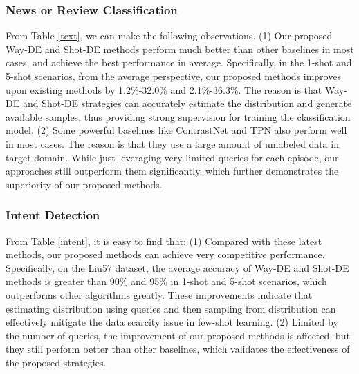 \documentclass[letterpaper]{article} %
\begin{document}
\subsubsection{News or Review Classification}
From Table \ref{text}, we can make the following observations. (1) Our proposed Way-DE and Shot-DE methods perform much better than other baselines in most cases, and achieve the best performance in average. Specifically, in the 1-shot and 5-shot scenarios, from the average perspective, our proposed methods improves upon existing methods by 1.2\%-32.0\% and 2.1\%-36.3\%. The reason is that Way-DE and Shot-DE strategies can accurately estimate the distribution and generate available samples, thus providing strong supervision for training the classification model.  (2) Some powerful baselines like ContrastNet and TPN also perform well in most cases. The reason is that they use a large amount of unlabeled data in target domain. While just leveraging very limited queries for each episode, our approaches still outperform them significantly, which further demonstrates the superiority of our proposed methods.

\subsubsection{Intent Detection}	
From Table \ref{intent}, it is easy to find that: (1) Compared with these latest methods, our proposed methods can achieve very competitive performance. Specifically, on the Liu57 dataset, the average accuracy of Way-DE and Shot-DE methods is greater than 90\% and 95\% in 1-shot and 5-shot scenarios, which outperforms other algorithms greatly. These improvements indicate that estimating distribution using queries and then sampling from distribution can effectively mitigate the data scarcity issue in few-shot learning. (2) Limited by the number of queries, the improvement of our proposed methods is affected, but they still perform better than other baselines, which validates the effectiveness of the proposed strategies.
\end{document}
